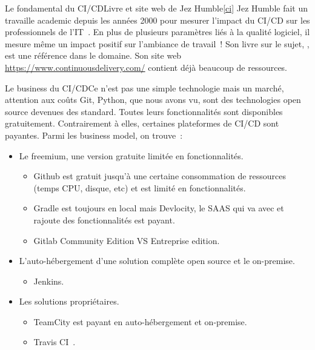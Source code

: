 \documentclass{beamer}
\begin{document}
    \begin{frame}{Le fondamental du CI/CD}{Livre et site web de Jez Humble\cref{ci}}
        \transdissolve
        Jez Humble fait un travaille academic depuis les années 2000 pour mesurer l'impact du CI/CD sur les professionnels de l'IT~.
        \bigbreak
        En plus de plusieurs paramètres liés à la qualité logiciel, il mesure même un impact positif sur l'ambiance de travail~!
        \bigbreak
        Son livre sur le sujet, , est une référence dans le domaine.
        Son site web \url{https://www.continuousdelivery.com/} contient déjà beaucoup de ressources.
    \end{frame}

    \begin{frame}{Le business du CI/CD}{Ce n'est pas une simple technologie mais un marché, attention aux coûts}
        \transdissolve
        Git, Python, que nous avons vu, sont des technologies open source devenues des standard.
        Toutes leurs fonctionnalités sont disponibles gratuitement.
        Contrairement à elles, certaines plateformes de CI/CD sont payantes.
        \bigbreak
        Parmi les business model, on trouve~:
        \begin{itemize}
            \item Le freemium, une version gratuite limitée en fonctionnalités.
            \begin{itemize}
                \item Github est gratuit jusqu'à une certaine consommation de ressources (temps CPU, disque, etc) et est limité en fonctionnalités.
                \item Gradle est toujours  en local mais Devlocity, le SAAS qui va avec et rajoute des fonctionnalités est payant.
                \item Gitlab Community Edition VS Entreprise edition.
            \end{itemize}
            \item L'auto-hébergement d'une solution complète open source et le on-premise.
            \begin{itemize}
                \item Jenkins.
            \end{itemize}
            \item Les solutions propriétaires.
            \begin{itemize}
                \item TeamCity est payant en auto-hébergement et on-premise.
                \item Travis CI~.
            \end{itemize}
        \end{itemize}
    \end{frame}
\end{document}
